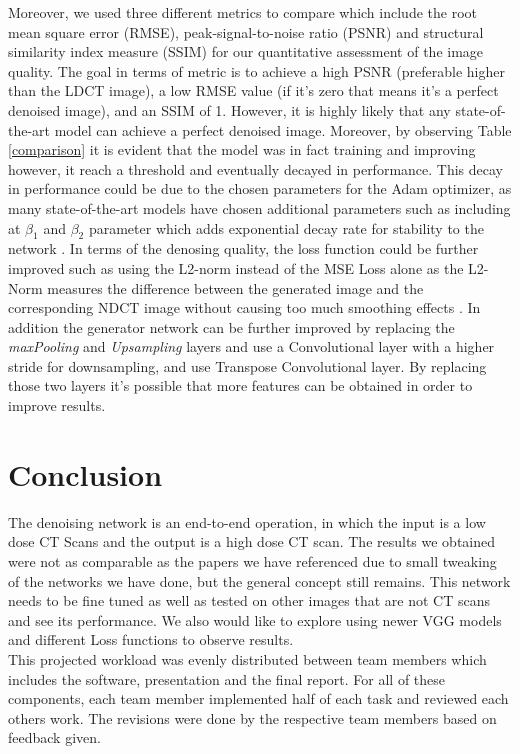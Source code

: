 \documentclass[journal]{IEEEtran}
\begin{document}
Moreover, we used three different metrics to compare which include the root mean square error (RMSE), peak-signal-to-noise ratio (PSNR) and structural similarity index measure (SSIM) for our quantitative assessment of the image quality.  The goal in terms of metric is to achieve a high PSNR (preferable higher than the LDCT image), a low RMSE value (if it's zero that means it's a perfect denoised image), and an SSIM of 1.  However, it is highly likely that any state-of-the-art model can achieve a perfect denoised image.  Moreover, by observing Table \ref{comparison} it is evident that the model was in fact training and improving however, it reach a threshold and eventually decayed in performance.  This decay in performance could be due to the chosen parameters for the Adam optimizer, as many state-of-the-art models have chosen additional parameters such as including at $\beta_1$ and $\beta_2$ parameter which adds exponential decay rate for stability to the network \cite{radford2015unsupervised}.  In terms of the denosing quality, the loss function could be further improved such as using the L2-norm instead of the MSE Loss alone as the L2-Norm measures the difference between the generated image and the corresponding NDCT image without causing too much smoothing effects \cite{yin2021unpaired}.  In addition the generator network can be further improved by replacing the \emph{maxPooling} and \emph{Upsampling} layers and use a Convolutional layer with a higher stride for downsampling, and use Transpose Convolutional layer.  By replacing those two layers it's possible that more features can be obtained in order to improve results. 

\section{Conclusion}
\label{conclusion}
The denoising network is an end-to-end operation, in which the input is a low dose CT Scans and the output is a high dose CT scan.  The results we obtained were not as comparable as the papers we have referenced due to small tweaking of the networks we have done, but the general concept still remains.  This network needs to be fine tuned as well as tested on other images that are not CT scans and see its performance.  We also would like to explore using newer VGG models and different Loss functions to observe results.\\
This projected workload was evenly distributed between team members which includes the software, presentation and the final report.  For all of these components, each team member implemented half of each task and reviewed each others work.  The revisions were done by the respective team members based on feedback given.  



\end{document}
